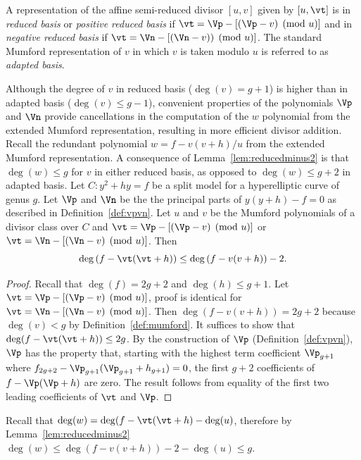 \bd\label{def:reducedbasis} A representation of the affine semi-reduced divisor
$[u,v]$ given by $[u,\vt]$ is in \emph{reduced basis} or \emph{positive reduced
basis} if $\vt =\Vp - [(\Vp - v) \pmod{u}]$ and in \emph{negative reduced basis}
if $\vt =  \Vn - [(\Vn - v)) \pmod{u}]$. The standard Mumford representation of
$v$ in which $v$ is taken modulo $u$ is referred to as \emph{adapted basis}.
\ed

Although the degree of $v$ in reduced basis ($\deg(v) = g+1$) is higher than in
adapted basis ($\deg(v) \leq g-1$), convenient properties of the polynomials
$\Vp$ and $\Vn$ provide cancellations in the computation of the $w$ polynomial
from the extended Mumford representation, resulting in more efficient divisor
addition. Recall the redundant polynomial $w = f - v(v+h)/u$ from the extended
Mumford representation. A consequence of Lemma~\ref{lem:reducedminus2} is that
$\deg(w) \leq g$ for $v$ in either reduced basis, as opposed to $\deg(w) \leq
g+2$ in adapted basis.
\bl
Let $C : y^2 + hy = f$ be a split model for a hyperelliptic curve of genus $g$.
Let $\Vp$ and $\Vn$ be the the principal parts of $y(y + h) - f = 0$ as
described in Definition~\ref{def:vpvn}. Let $u$ and $v$ be the Mumford
polynomials of a divisor class over $C$ and $\vt = \Vp - [(\Vp - v) \pmod{u}]$
or $\vt = \Vn - [(\Vn - v) \pmod{u}]$. Then $$\deg \left( f - \vt(\vt+h)\right)
\leq \deg \left( f - v(v+h)\right) - 2.$$

\begin{proof}\label{lem:reducedminus2}
Recall that $\deg(f) = 2g + 2$ and $\deg(h) \leq g+1$. Let $\vt = \Vp - [(\Vp -
v) \pmod{u}]$, proof is identical for $\vt = \Vn - [(\Vn - v) \pmod{u}]$. Then
$\deg(f - v(v+h)) = 2g + 2$ because $\deg(v) < g$ by
Definition~\ref{def:mumford}. It suffices to show that $\deg(f - \vt(\vt+h))
\leq 2g$. By the construction of $\Vp$ (Definition~\ref{def:vpvn}), $\Vp$ has
the property that, starting with the highest term coefficient $\Vp_{g+1}$ where
$f_{2g + 2} -\Vp_{g+1}(\Vp_{g+1} + h_{g+1}) = 0$, the first $g + 2 $
coefficients of $f - \Vp(\Vp + h)$ are zero. The result follows from equality of
the first two leading coefficients of $\vt$ and $\Vp$.
\end{proof}
\el
Recall that $\deg(w) = \deg(f - \vt(\vt+h) - \deg(u)$, therefore by
Lemma~\ref{lem:reducedminus2} $\deg(w) \leq \deg \left( f - v(v+h)\right) - 2 -
\deg(u) \leq g$.


